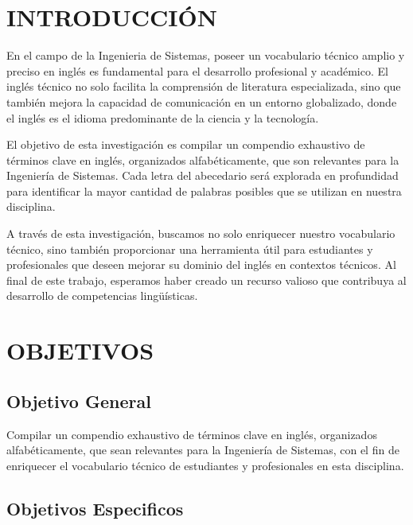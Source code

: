 \section{INTRODUCCIÓN}

    En el campo de la Ingenieria de Sistemas, poseer un vocabulario técnico amplio y preciso en inglés es fundamental para el desarrollo profesional y académico. El inglés técnico no solo facilita la comprensión de literatura especializada, sino que también mejora la capacidad de comunicación en un entorno globalizado, donde el inglés es el idioma predominante de la ciencia y la tecnología. \newline
    
    El objetivo de esta investigación es compilar un compendio exhaustivo de términos clave en inglés, organizados alfabéticamente, que son relevantes para la Ingeniería de Sistemas. Cada letra del abecedario será explorada en profundidad para identificar la mayor cantidad de palabras posibles que se utilizan en nuestra disciplina. \newline
    
    A través de esta investigación, buscamos no solo enriquecer nuestro vocabulario técnico, sino también proporcionar una herramienta útil para estudiantes y profesionales que deseen mejorar su dominio del inglés en contextos técnicos. Al final de este trabajo, esperamos haber creado un recurso valioso que contribuya al desarrollo de competencias lingüísticas.

\section{OBJETIVOS}

    \subsection{Objetivo General}
        
        Compilar un compendio exhaustivo de términos clave en inglés, organizados alfabéticamente, que sean relevantes para la Ingeniería de Sistemas, con el fin de enriquecer el vocabulario técnico de estudiantes y profesionales en esta disciplina.

    \subsection{Objetivos Especificos}

